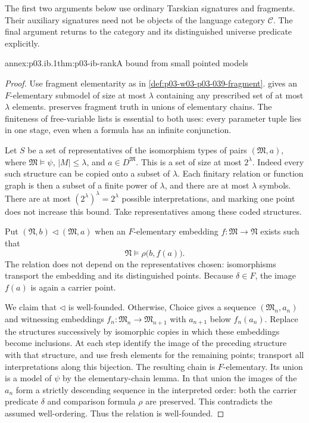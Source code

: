 The first two arguments below use ordinary Tarskian signatures and
fragments. Their auxiliary signatures need not be objects of the
language category \(\mathcal C\). The final argument returns to the
category and its distinguished universe predicate explicitly.

\begin{annexitem}{annex:p03.ib.1}{thm:p03-ib-rank}{A bound from small pointed models}
\begin{proof}
Use fragment elementarity as in
\cref{def:p03-w03-p03-039-fragment}.
 gives an
\(F\)-elementary submodel of size at most \(\lambda\)
containing any prescribed set of at most \(\lambda\) elements.
 preserves fragment
truth in unions of elementary chains. The finiteness of free-variable
lists is essential to both uses: every parameter tuple lies in one
stage, even when a formula has an infinite conjunction.

Let \(S\) be a set of representatives of the isomorphism types of
pairs \((\mathfrak M,a)\), where \(\mathfrak M\models\psi\),
\(|M|\leq\lambda\), and \(a\in D^{\mathfrak M}\).
This is a set of size at most \(2^\lambda\). Indeed every such
structure can be copied onto a subset of \(\lambda\). Each
finitary relation or function graph is then a subset of a finite
power of \(\lambda\), and there are at most \(\lambda\) symbols.
There are at most \((2^\lambda)^\lambda=2^\lambda\) possible
interpretations, and marking one point does not increase this
bound. Take representatives among these coded structures.

Put \((\mathfrak N,b)\triangleleft(\mathfrak M,a)\) when an
\(F\)-elementary embedding \(f:\mathfrak M\to\mathfrak N\)
exists such that
\[
 \mathfrak N\models\rho\bigl(b,f(a)\bigr).
\]
The relation does not depend on the representatives chosen:
isomorphisms transport the embedding and its distinguished points.
Because \(\delta\in F\), the image \(f(a)\) is again a
carrier point.

We claim that \(\triangleleft\) is well-founded. Otherwise,
Choice gives a sequence \((\mathfrak M_n,a_n)\) and witnessing
embeddings \(f_n:\mathfrak M_n\to\mathfrak M_{n+1}\) with
\(a_{n+1}\) below \(f_n(a_n)\). Replace the structures successively
by isomorphic copies in which these embeddings become inclusions.
At each step identify the image of the preceding structure with
that structure, and use fresh elements for the remaining points;
transport all interpretations along this bijection.
The resulting chain is \(F\)-elementary. Its union is a model
of \(\psi\) by the elementary-chain lemma. In that union the
images of the \(a_n\) form a strictly descending sequence in the
interpreted order: both the carrier predicate \(\delta\) and
comparison formula \(\rho\) are preserved. This contradicts
the assumed well-ordering. Thus the relation is well-founded.


\end{proof}
\end{annexitem}

